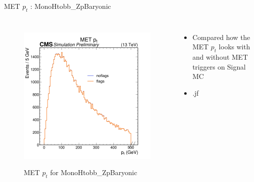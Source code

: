 \documentclass[10pt,xcolor=dvipsnames]{beamer}
\begin{document}
  \begin{frame}[fragile]{MET $p_t$ : MonoHtobb\_ZpBaryonic} 
    \begin{columns}
    \begin{figure} 
    \centering 
     \includegraphics[width=1\textwidth]{../Archive/KinemPlots/MCptMETflags.png }
    \label{METMCflagpt} 
    \caption{MET $p_t$ for MonoHtobb\_ZpBaryonic}
    \end{figure} 
    \begin{itemize} 
    \raggedright 
    \small
    \item Compared how the MET $p_t$ looks with and without MET triggers on Signal MC
    \item .jf
    \end{itemize}
    \end{columns} 
    \end{frame}
\end{document}
